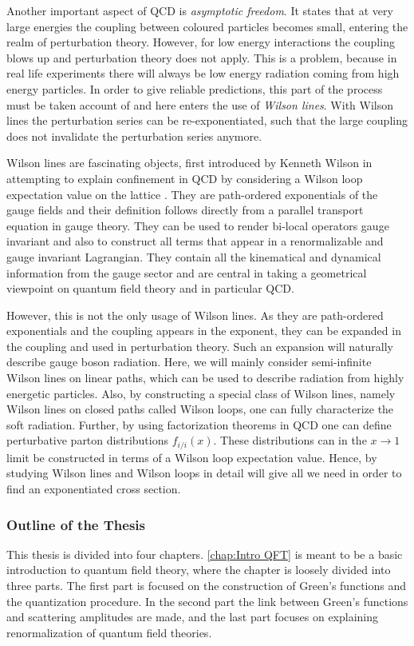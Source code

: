 Another important aspect of QCD is \emph{asymptotic freedom}. It states that at very large energies the coupling between coloured particles becomes small, entering the realm of perturbation theory. However, for low energy interactions the coupling blows up and perturbation theory does not apply. This is a problem, because in real life experiments there will always be low energy radiation coming from high energy particles. In order to give reliable predictions, this part of the process must be taken account of and here enters the use of \emph{Wilson lines}. With Wilson lines the perturbation series can be re-exponentiated, such that the large coupling does not invalidate the perturbation series anymore. 

Wilson lines are fascinating objects, first introduced by Kenneth Wilson in attempting to explain confinement in QCD by considering a Wilson loop expectation value on the lattice \cite{Wilson:74}. They are path-ordered exponentials of the gauge fields and their definition follows directly from a parallel transport equation in gauge theory. They can be used to render bi-local operators gauge invariant and also to construct all terms that appear in a renormalizable and gauge invariant Lagrangian. They contain all the kinematical and dynamical information from the gauge sector and are central in taking a geometrical viewpoint on quantum field theory and in particular QCD. 

However, this is not the only usage of Wilson lines. As they are path-ordered exponentials and the coupling appears in the exponent, they can be expanded in the coupling and used in perturbation theory. Such an expansion will naturally describe gauge boson radiation. Here, we will mainly consider semi-infinite Wilson lines on linear paths, which can be used to describe radiation from highly energetic particles. Also, by constructing a special class of Wilson lines, namely Wilson lines on closed paths called Wilson loops, one can fully characterize the soft radiation. Further, by using factorization theorems in QCD one can define perturbative parton distributions $f_{i/i}(x)$. These distributions can in the $x\rightarrow 1$ limit be constructed in terms of a Wilson loop expectation value. Hence, by studying Wilson lines and Wilson loops in detail will give all we need in order to find an exponentiated cross section.




\subsubsection*{Outline of the Thesis}
This thesis is divided into four chapters. \cref{chap:Intro QFT} is meant to be a basic introduction to quantum field theory, where  the chapter is loosely divided into three parts. The first part is focused on the construction of Green's functions and the quantization procedure. In the second part the link between Green's functions and scattering amplitudes are made, and the last part focuses on explaining renormalization of quantum field theories.

